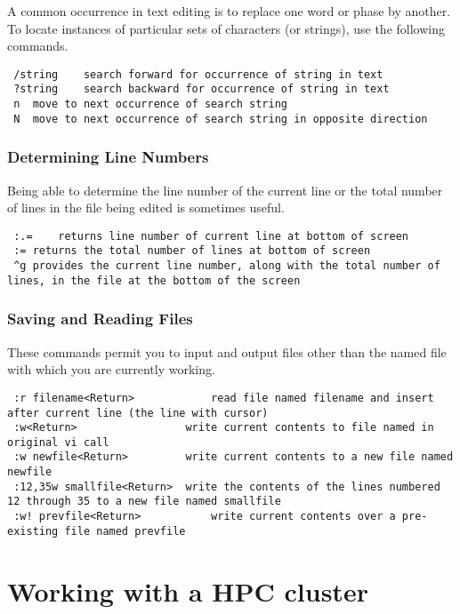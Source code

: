A common occurrence in text editing is to replace one word or phase by another. To locate instances of particular sets of characters (or strings), use the following commands.

\begin{lstlisting}
 /string	search forward for occurrence of string in text
 ?string	search backward for occurrence of string in text
 n	move to next occurrence of search string
 N	move to next occurrence of search string in opposite direction
\end{lstlisting}

\subsubsection{Determining Line Numbers}

Being able to determine the line number of the current line or the total number of lines in the file being edited is sometimes useful.

\begin{lstlisting}
 :.=	returns line number of current line at bottom of screen
 :=	returns the total number of lines at bottom of screen
 ^g	provides the current line number, along with the total number of lines, in the file at the bottom of the screen
\end{lstlisting}

\subsubsection{Saving and Reading Files}

These commands permit you to input and output files other than the named file with which you are currently working.

\begin{lstlisting}
 :r filename<Return>	        read file named filename and insert after current line (the line with cursor)
 :w<Return>	                write current contents to file named in original vi call
 :w newfile<Return>	        write current contents to a new file named newfile
 :12,35w smallfile<Return>	write the contents of the lines numbered 12 through 35 to a new file named smallfile
 :w! prevfile<Return>	        write current contents over a pre-existing file named prevfile
\end{lstlisting}

\section{Working with a HPC cluster}
